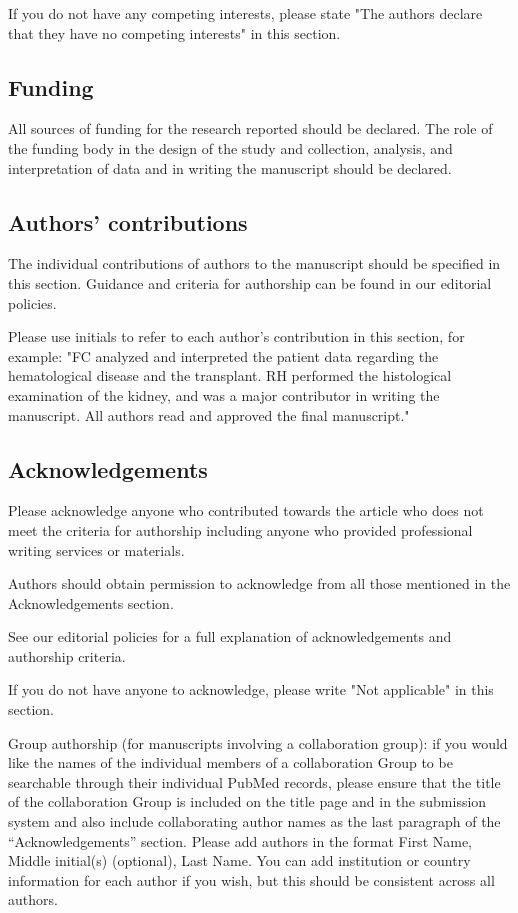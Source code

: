 \documentclass{bmcart}
\begin{document}
\begin{backmatter}
If you do not have any competing interests, please state "The authors declare that they have no competing interests" in this section.

\subsection*{Funding}

All sources of funding for the research reported should be declared. The role of the funding body in the design of the study and collection, analysis, and interpretation of data and in writing the manuscript should be declared.

\subsection*{Authors' contributions}

The individual contributions of authors to the manuscript should be specified in this section. Guidance and criteria for authorship can be found in our editorial policies.

Please use initials to refer to each author's contribution in this section, for example: "FC analyzed and interpreted the patient data regarding the hematological disease and the transplant. RH performed the histological examination of the kidney, and was a major contributor in writing the manuscript. All authors read and approved the final manuscript."

\subsection*{Acknowledgements}

Please acknowledge anyone who contributed towards the article who does not meet the criteria for authorship including anyone who provided professional writing services or materials.

Authors should obtain permission to acknowledge from all those mentioned in the Acknowledgements section.

See our editorial policies for a full explanation of acknowledgements and authorship criteria.

If you do not have anyone to acknowledge, please write "Not applicable" in this section.

Group authorship (for manuscripts involving a collaboration group): if you would like the names of the individual members of a collaboration Group to be searchable through their individual PubMed records, please ensure that the title of the collaboration Group is included on the title page and in the submission system and also include collaborating author names as the last paragraph of the “Acknowledgements” section. Please add authors in the format First Name, Middle initial(s) (optional), Last Name. You can add institution or country information for each author if you wish, but this should be consistent across all authors.


\end{backmatter}
\end{document}
